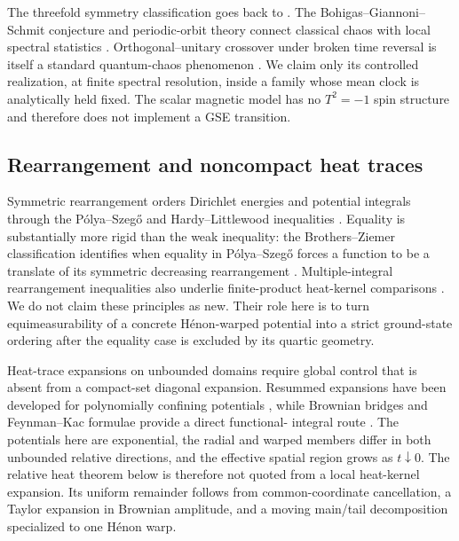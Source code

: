 The threefold symmetry classification goes back to \citet{Dyson1962}.
The Bohigas--Giannoni--Schmit conjecture and periodic-orbit theory connect
classical chaos with local spectral statistics
\citep{BohigasGiannoniSchmit1984,Gutzwiller1971,Gutzwiller1990,Berry1985,Haake2010}.
Orthogonal--unitary crossover under broken time reversal is itself a standard
quantum-chaos phenomenon \citep{PandeyMehta1983,SaitoEtAl2009}.  We claim
only its controlled realization, at finite spectral resolution, inside a
family whose mean clock is analytically held fixed.  The scalar magnetic
model has no \(T^2=-1\) spin structure and therefore does not implement a
GSE transition.

\subsection{Rearrangement and noncompact heat traces}

Symmetric rearrangement orders Dirichlet energies and potential integrals
through the P\'olya--Szeg\H{o} and Hardy--Littlewood inequalities
\citep{LiebLoss2001}.  Equality is substantially more rigid than the weak
inequality: the Brothers--Ziemer classification identifies when equality in
P\'olya--Szeg\H{o} forces a function to be a translate of its symmetric
decreasing rearrangement \citep{BrothersZiemer1988}.  Multiple-integral
rearrangement inequalities also underlie finite-product heat-kernel comparisons
\citep{BrascampLiebLuttinger1974}.  We do not claim these principles as new.
Their role here is to turn equimeasurability of a concrete H\'enon-warped
potential into a strict ground-state ordering after the equality case is
excluded by its quartic geometry.

Heat-trace expansions on unbounded domains require global control that is
absent from a compact-set diagonal expansion.  Resummed expansions have been
developed for polynomially confining potentials \citep{Fucci2018}, while
Brownian bridges and Feynman--Kac formulae provide a direct functional-
integral route \citep{Simon2005FunctionalIntegration,BoldtGueneysu2023}.
The potentials here are exponential, the radial and warped members differ
in both unbounded relative directions, and the effective spatial region
grows as \(t\downarrow0\).  The relative heat theorem below is therefore not
quoted from a local heat-kernel expansion.  Its uniform remainder follows
from common-coordinate cancellation, a Taylor expansion in Brownian
amplitude, and a moving main/tail decomposition specialized to one H\'enon
warp.

